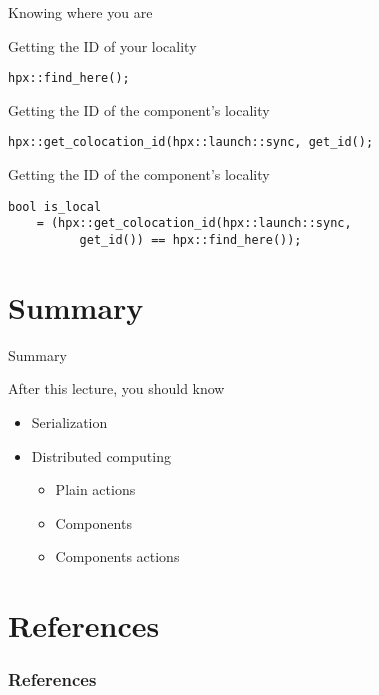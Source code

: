 \documentclass[12pt,t]{beamer}
\begin{document}
\begin{frame}[fragile]{Knowing where you are}

\begin{block}{Getting the ID of your locality}
\begin{lstlisting}
hpx::find_here();
\end{lstlisting}
\end{block}

\begin{block}{Getting the ID of the component's locality}
\begin{lstlisting}
hpx::get_colocation_id(hpx::launch::sync, get_id();
\end{lstlisting}
\end{block}

\begin{block}{Getting the ID of the component's locality}
\begin{lstlisting}
bool is_local 
    = (hpx::get_colocation_id(hpx::launch::sync, 
          get_id()) == hpx::find_here());
\end{lstlisting}
\end{block}

\end{frame}

\section{Summary}
\begin{frame}{Summary}
\begin{block}{After this lecture, you should know}
\begin{itemize}
\item Serialization
\item Distributed computing
\begin{itemize}
\item Plain actions
\item Components
\item Components actions
\end{itemize}
\end{itemize}
\end{block}
\end{frame}

\section{References}

\begin{frame}[t, allowframebreaks]
\frametitle{References}


\end{frame}
\end{document}

